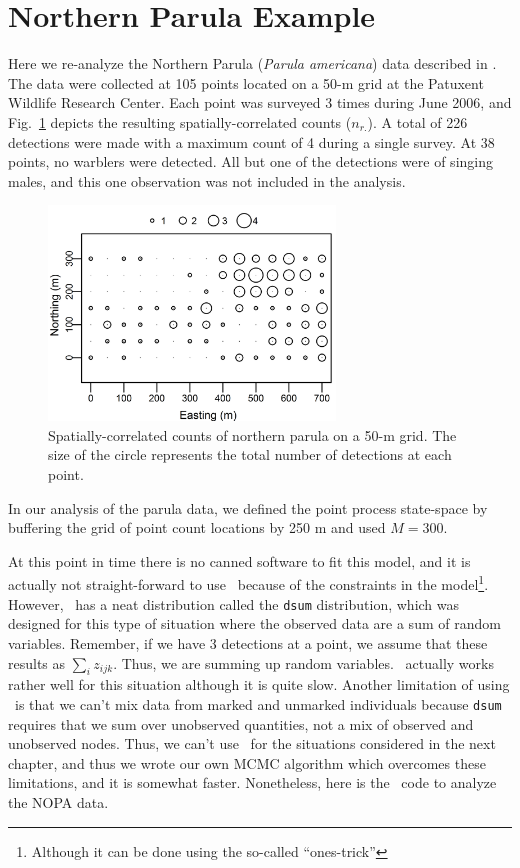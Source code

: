 \section{Northern Parula Example}

Here we re-analyze the Northern Parula ({\it Parula americana}) data
described in \citet{chandler_royle:2012}. The data were collected at
105 points located on a 50-m grid at the Patuxent Wildlife Research
Center. Each point was surveyed 3 times during June 2006, and
Fig.~\ref{fig:nopaDat} depicts the resulting spatially-correlated
counts ($n_{r.}$).
A total of 226 detections were made with a maximum count of 4 during a
single survey. At 38 points, no warblers were detected. All but one of
the detections were of singing males, and this one observation was
not included in the analysis.


\begin{figure}
  \centering
  \includegraphics[width=3in,height=2.25in]{Ch18-Unmarked/figs/nopa}
  \caption{Spatially-correlated counts of northern parula on a 50-m
    grid. The size of the circle represents the total number of
    detections at each point.}
  \label{fig:nopaDat}
\end{figure}



In our analysis of the parula data, we defined the point process
state-space by buffering the grid of point
count locations by 250 m and used $M=300$.

At this point in time there is no canned software to fit this model,
and it is actually not straight-forward to use \bugs~because of the
constraints in the model\footnote{Although it can be done using the
  so-called ``ones-trick''}. However, \jags~has a neat distribution
called the \verb+dsum+ distribution, which was designed for this type
of situation where the observed data are a sum of random
variables. Remember, if we have 3 detections at a point, we assume
that these results as $\sum_i z_{ijk}$. Thus, we are summing up random
variables. \jags~actually works rather well for this situation
although it is quite slow. Another limitation of using \jags~is that
we can't mix data from marked and unmarked individuals because
\verb+dsum+ requires that we sum over unobserved quantities, not a mix
of observed and unobserved nodes. Thus, we can't use \jags~for the
situations considered in the next chapter, and thus we wrote our own
MCMC algorithm which overcomes these limitations, and it is somewhat
faster. Nonetheless, here is the \jags~code to analyze the NOPA data.

